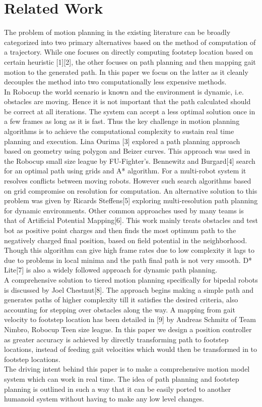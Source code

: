 \documentclass[letterpaper, 10 pt, conference]{ieeeconf}  %
\begin{document}
\section{Related Work}
The problem of motion planning in the existing literature can be broadly categorized into two primary alternatives based on the method of computation of a trajectory. While one focuses on directly computing footstep location based on certain heuristic [1][2], the other focuses on path planning and then mapping gait motion to the generated path. In this paper we focus on the latter as it cleanly decouples the method into two computationally less expensive methods.\\
In Robocup the world scenario is known and the environment is dynamic, i.e. obstacles are moving. Hence it is not important that the path calculated should be correct at all iterations. The system can accept a less optimal solution once in a few frames as long as it is fast. Thus the key challenge in motion planning algorithms is to achieve the computational complexity to sustain real time planning and execution.
Lina Ourima [3] explored a path planning approach based on geometry using polygon and Beizer curves. This approach was used in the Robocup small size league by FU-Fighter's. Bennewitz and Burgard[4] search for an optimal path using grids and A* algorithm. For a multi-robot system it resolves conflicts between moving robots. However such search algorithms based on grid compromise on resolution for computation. An alternative solution to this problem was given by Ricards Steffens[5] exploring multi-resolution path planning for dynamic environments. Other common approaches used by many teams is that of Artificial Potential Mapping[6]. This work mainly treats obstacles and test bot as positive point charges and then finds the most optimum path to the negatively charged final position, based on field potential in the neighborhood. Though this algorithm can give high frame rates due to low complexity it lags to due to problems in local minima and the path final path is not very smooth. D* Lite[7] is also a widely followed approach for dynamic path planning.\\
A comprehensive solution to tiered motion planning specifically for bipedal robots is discussed by Joel Chestnut[8]. The approach begins making a simple path and generates paths of higher complexity till it satisfies the desired criteria, also accounting for stepping over obstacles along the way. A mapping from gait velocity to footstep location has been detailed in [9] by Andreas Schmitz of Team Nimbro, Robocup Teen size league. In this paper we design a position controller as greater accuracy is achieved by directly transforming path to footstep locations, instead of feeding gait velocities which would then be transformed in to footstep locations.\\
The driving intent behind this paper is to make a comprehensive motion model system which can work in real time. The idea of path planning and footstep planning is outlined in such a way that it can be easily ported to another humanoid system without having to make any low level changes.
\end{document}
